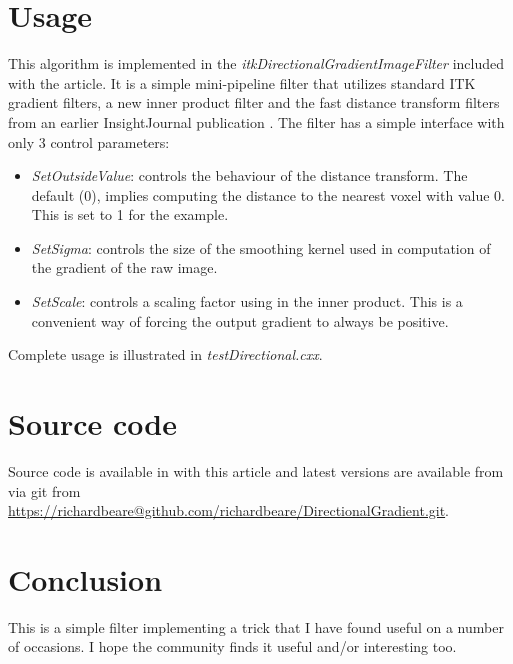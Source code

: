 \documentclass{InsightArticle}
\begin{document}
\section{Usage}
This algorithm is implemented in the {\em
  itkDirectionalGradientImageFilter} included with the article. It is
a simple mini-pipeline filter that utilizes standard ITK gradient
filters, a new inner product filter and the fast distance transform
filters from an earlier InsightJournal publication \cite{Beare2008e}. The filter has a simple interface with only 3 control parameters:
\begin{itemize}
\item {\em SetOutsideValue}: controls the behaviour of the distance transform. The default (0), implies computing the distance to the nearest voxel with value 0. This is set to 1 for the example.
\item {\em SetSigma}: controls the size of the smoothing kernel used in computation of the gradient of the raw image.
\item {\em SetScale}: controls a scaling factor using in the inner product. This is a convenient way of forcing the output gradient to always be positive. 
\end{itemize}
Complete usage is illustrated in {\em testDirectional.cxx}.

\section{Source code}
Source code is available in with this article and latest versions are
available from via git from
\url{https://richardbeare@github.com/richardbeare/DirectionalGradient.git}.
\section{Conclusion}
This is a simple filter implementing a trick that I have found useful
on a number of occasions. I hope the community finds it useful and/or
interesting too.

 
\nocite{ITKSoftwareGuide}
\end{document}
